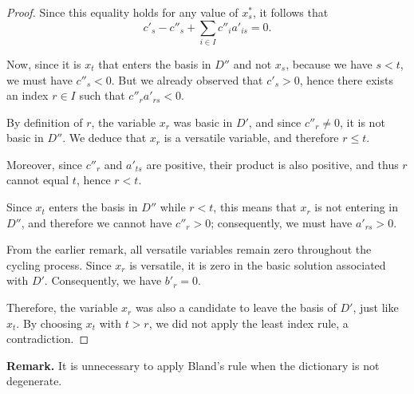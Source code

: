 \begin{proof}
    Since this equality holds for any value of $x^*_s$, it follows that
    \[
    c'_s - c''_s + \sum_{i \in I} c''_i a'_{is} = 0 .
    \]

    Now, since it is $x_t$ that enters the basis in $D''$ and not $x_s$, because we have $s < t$, we must have $c''_s < 0$. But we already observed that $c'_s > 0$, hence there exists an index $r \in I$ such that $c''_r a'_{rs} < 0$.

    By definition of $r$, the variable $x_r$ was basic in $D'$, and since $c''_r \neq 0$, it is not basic in $D''$. We deduce that $x_r$ is a versatile variable, and therefore $r \leqslant t$.

    Moreover, since $c''_r$ and $a'_{ts}$ are positive, their product is also positive, and thus $r$ cannot equal $t$, hence $r < t$.

    Since $x_t$ enters the basis in $D''$ while $r < t$, this means that $x_r$ is not entering in $D''$, and therefore we cannot have $c''_r > 0$; consequently, we must have $a'_{rs} > 0$.

    From the earlier remark, all versatile variables remain zero throughout the cycling process. Since $x_r$ is versatile, it is zero in the basic solution associated with $D'$. Consequently, we have $b'_r = 0$.

    Therefore, the variable $x_r$ was also a candidate to leave the basis of $D'$, just like $x_t$. By choosing $x_t$ with $t > r$, we did not apply the least index rule, a contradiction.
\end{proof}

\textbf{Remark.} It is unnecessary to apply Bland's rule when the dictionary is not degenerate.